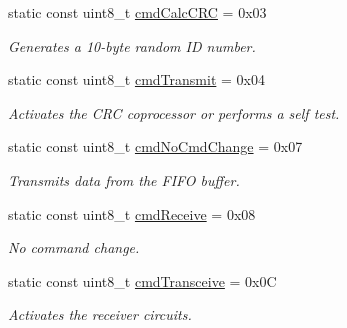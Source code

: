 \begin{DoxyCompactItemize}
\mbox{\label{classMFRC522_ac846a3bc11884b6ef2727b08bfa1597f}} 
static const uint8\+\_\+t \hyperlink{classMFRC522_ac846a3bc11884b6ef2727b08bfa1597f}{cmd\+Calc\+C\+RC} = 0x03
\begin{DoxyCompactList}\small\item\em Generates a 10-\/byte random ID number. \end{DoxyCompactList}\item 
\mbox{\label{classMFRC522_a583d65bc8e373170a37502a3db46ccee}} 
static const uint8\+\_\+t \hyperlink{classMFRC522_a583d65bc8e373170a37502a3db46ccee}{cmd\+Transmit} = 0x04
\begin{DoxyCompactList}\small\item\em Activates the C\+RC coprocessor or performs a self test. \end{DoxyCompactList}\item 
\mbox{\label{classMFRC522_a9da4cae4ffc7a4ee4704660d1a63c78d}} 
static const uint8\+\_\+t \hyperlink{classMFRC522_a9da4cae4ffc7a4ee4704660d1a63c78d}{cmd\+No\+Cmd\+Change} = 0x07
\begin{DoxyCompactList}\small\item\em Transmits data from the F\+I\+FO buffer. \end{DoxyCompactList}\item 
\mbox{\label{classMFRC522_a45174d03bf2ae78cffed9e2d94b78343}} 
static const uint8\+\_\+t \hyperlink{classMFRC522_a45174d03bf2ae78cffed9e2d94b78343}{cmd\+Receive} = 0x08
\begin{DoxyCompactList}\small\item\em No command change. \end{DoxyCompactList}\item 
\mbox{\label{classMFRC522_afecac251dc4b33d217f9c606d1e72b6d}} 
static const uint8\+\_\+t \hyperlink{classMFRC522_afecac251dc4b33d217f9c606d1e72b6d}{cmd\+Transceive} = 0x0C
\begin{DoxyCompactList}\small\item\em Activates the receiver circuits. \end{DoxyCompactList}\item 
\mbox{\label{classMFRC522_afae620bc8a05c0dc01b87673ac2b2f02}} 

\end{DoxyCompactItemize}
